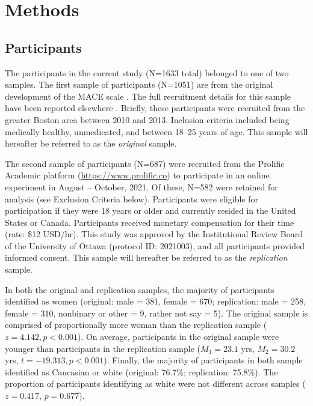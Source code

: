 \documentclass[letterpaper,man,natbib]{apa6}  %
\begin{document}
\section{Methods}

\subsection{Participants}

The participants in the current study (N=1633 total) belonged to one of two samples. The first sample of participants (N=1051) are from the original development of the MACE scale \citep{teicher2015maltreatment}. The full recruitment details for this sample have been reported elsewhere \citep{teicher2015maltreatment}. Briefly, these participants were recruited from the greater Boston area between 2010 and 2013. Inclusion criteria included being medically healthy, unmedicated, and between 18–25 years of age.  This sample will hereafter be referred to as the \textit{original} sample. 

The second sample of participants (N=687) were recruited from the Prolific Academic platform (\url{https://www.prolific.co}) to participate in an online experiment in August -- October, 2021. Of these, N=582 were retained for analysis (see Exclusion Criteria below). Participants were eligible for participation if they were 18 years or older and currently resided in the United States or Canada. Participants received monetary compensation for their time (rate: \$12 USD/hr). This study was approved by the Institutional Review Board of the University of Ottawa (protocol ID: 2021003), and all participants provided informed consent. This sample will hereafter be referred to as the \textit{replication} sample. 

In both the original and replication samples, the majority of participants identified as women (original: male = 381, female = 670; replication: male = 258, female = 310, nonbinary or other = 9, rather not say = 5). The original sample is comprised of proportionally more woman than the replication sample ($z = 4.142, p < 0.001$). On average, participants in the original sample were younger than participants in the replication sample ($M_1 = 23.1$ yrs, $M_2 = 30.2$ yrs, $t = -19.313, p < 0.001$). Finally, the majority of participants in both sample identified as Caucasian or white (original: 76.7\%; replication: 75.8\%). The proportion of participants identifying as white were not different across samples ($z = 0.417$, $p = 0.677$). 
\end{document}
